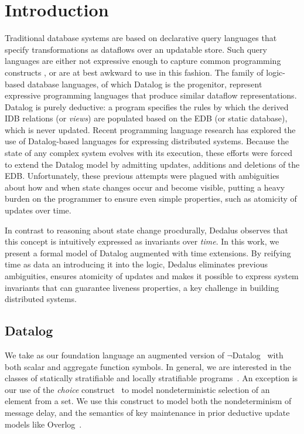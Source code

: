 \section{Introduction}

Traditional database systems are based on declarative query languages that
specify transformations as dataflows over an updatable store.  Such query
languages are either not expressive enough to capture common programming
constructs , or are at best awkward to use in this fashion.
 The family of logic-based database languages, of
which Datalog is the progenitor, represent expressive programming languages
that produce similar dataflow representations.  Datalog is purely deductive: a
program specifies the rules by which the derived IDB relations (or
\emph{views}) are populated based on the EDB (or static database), which is
never updated.  Recent programming language research has explored the use of
Datalog-based languages for expressing distributed systems.  Because the state
of any complex system evolves with its execution, these efforts were forced to
extend the Datalog model by admitting updates, additions and deletions of the
EDB.  Unfortunately, these previous attempts were plagued with ambiguities
about how and when state changes occur and become visible, putting a heavy
burden on the programmer to ensure even simple properties, such as atomicity of
updates over time.

In contrast to reasoning about state change procdurally, Dedalus observes
that this concept is intuitively expressed as invariants over {\em time}.  In
this work, we present a formal model of Datalog augmented with time extensions.
By reifying time as data an introducing it into the logic, Dedalus eliminates
previous ambiguities, ensures atomicity of updates and makes it possible to
express system invariants that can guarantee liveness properties, a key
challenge in building distributed systems.

\subsection{Datalog}

We take as our foundation language an augmented version of \linebreak
$\lnot$Datalog~\cite{ullmanbook} with both scalar and aggregate function
symbols.  In general, we are interested in the classes of statically
stratifiable and locally stratifiable programs~\cite{prz}.  An exception is our
use of the \emph{choice} construct~\cite{greedychoice, eventchoice} to model
nondeterministic selection of an element from a set.  We use this construct to
model both the nondeterminism of message delay, and the semantics of key
maintenance in prior deductive update models like Overlog~\cite{boon}.
